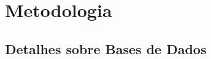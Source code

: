 \documentclass{beamer}
\begin{document}
%		
%		
%		
%		
%				
%		

	\section[Metodologia]{Metodologia}
	
	\subsection[Bases de Dados]{Detalhes sobre Bases de Dados}
	
\end{document}
